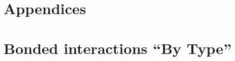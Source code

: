 \documentclass[11pt]{article}
\begin{document}
\pagebreak

%
%






\appendix
\section*{Appendices}

\section{Bonded interactions ``By Type''}
\label{sec:nbody_by_type}
\end{document}
